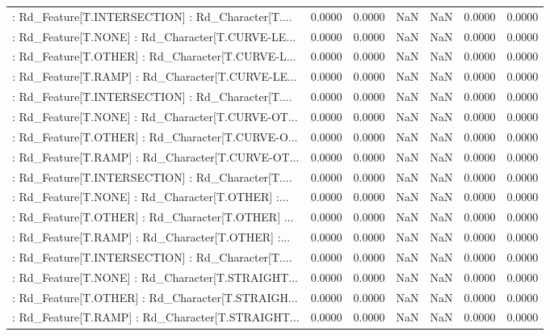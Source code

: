 \begin{longtable}{p{4cm}cccccc}
 : Rd\_Feature[T.INTERSECTION] : Rd\_Character[T.... &  0.0000 &    0.0000 &     NaN &          NaN &  0.0000 &  0.0000 \\
 : Rd\_Feature[T.NONE] : Rd\_Character[T.CURVE-LE... &  0.0000 &    0.0000 &     NaN &          NaN &  0.0000 &  0.0000 \\
 : Rd\_Feature[T.OTHER] : Rd\_Character[T.CURVE-L... &  0.0000 &    0.0000 &     NaN &          NaN &  0.0000 &  0.0000 \\
 : Rd\_Feature[T.RAMP] : Rd\_Character[T.CURVE-LE... &  0.0000 &    0.0000 &     NaN &          NaN &  0.0000 &  0.0000 \\
 : Rd\_Feature[T.INTERSECTION] : Rd\_Character[T.... &  0.0000 &    0.0000 &     NaN &          NaN &  0.0000 &  0.0000 \\
 : Rd\_Feature[T.NONE] : Rd\_Character[T.CURVE-OT... &  0.0000 &    0.0000 &     NaN &          NaN &  0.0000 &  0.0000 \\
 : Rd\_Feature[T.OTHER] : Rd\_Character[T.CURVE-O... &  0.0000 &    0.0000 &     NaN &          NaN &  0.0000 &  0.0000 \\
 : Rd\_Feature[T.RAMP] : Rd\_Character[T.CURVE-OT... &  0.0000 &    0.0000 &     NaN &          NaN &  0.0000 &  0.0000 \\
 : Rd\_Feature[T.INTERSECTION] : Rd\_Character[T.... &  0.0000 &    0.0000 &     NaN &          NaN &  0.0000 &  0.0000 \\
 : Rd\_Feature[T.NONE] : Rd\_Character[T.OTHER] :... &  0.0000 &    0.0000 &     NaN &          NaN &  0.0000 &  0.0000 \\
 : Rd\_Feature[T.OTHER] : Rd\_Character[T.OTHER] ... &  0.0000 &    0.0000 &     NaN &          NaN &  0.0000 &  0.0000 \\
 : Rd\_Feature[T.RAMP] : Rd\_Character[T.OTHER] :... &  0.0000 &    0.0000 &     NaN &          NaN &  0.0000 &  0.0000 \\
 : Rd\_Feature[T.INTERSECTION] : Rd\_Character[T.... &  0.0000 &    0.0000 &     NaN &          NaN &  0.0000 &  0.0000 \\
 : Rd\_Feature[T.NONE] : Rd\_Character[T.STRAIGHT... &  0.0000 &    0.0000 &     NaN &          NaN &  0.0000 &  0.0000 \\
 : Rd\_Feature[T.OTHER] : Rd\_Character[T.STRAIGH... &  0.0000 &    0.0000 &     NaN &          NaN &  0.0000 &  0.0000 \\
 : Rd\_Feature[T.RAMP] : Rd\_Character[T.STRAIGHT... &  0.0000 &    0.0000 &     NaN &          NaN &  0.0000 &  0.0000 \\

\end{longtable}
